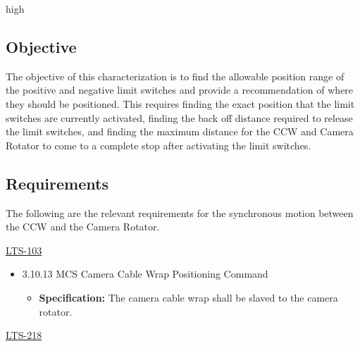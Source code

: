 high\documentclass[SE,lsstdraft,authoryear,toc]{lsstdoc}
\begin{document}
\subsection{Objective}

The objective of this characterization is to find the allowable position
range of the positive and negative limit switches and provide a
recommendation of where they should be positioned. This requires finding
the exact position that the limit switches are currently activated,
finding the back off distance required to release the limit switches,
and finding the maximum distance for the CCW and Camera Rotator to come
to a complete stop after activating the limit switches.

\subsection{Requirements}

The following are the relevant requirements for the synchronous motion
between the CCW and the Camera Rotator.

\underline{LTS-103}

\begin{itemize}
\item
  3.10.13 MCS Camera Cable Wrap Positioning Command

  \begin{itemize}
  \item
    \textbf{Specification:} The camera cable wrap shall be slaved to the
    camera rotator.
  \end{itemize}
\end{itemize}

\underline{LTS-218}
\end{document}
